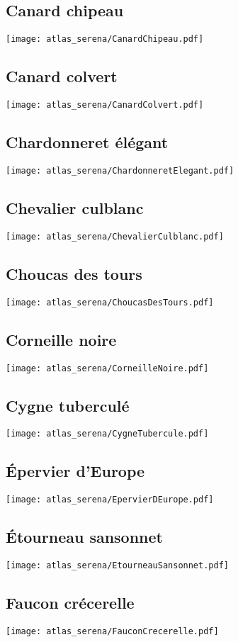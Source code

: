 \subsection{Canard chipeau}
\texttt{[image: atlas\_serena/CanardChipeau.pdf]}
\subsection{Canard colvert}
\texttt{[image: atlas\_serena/CanardColvert.pdf]}
\subsection{Chardonneret élégant}
\texttt{[image: atlas\_serena/ChardonneretElegant.pdf]}
\subsection{Chevalier culblanc}
\texttt{[image: atlas\_serena/ChevalierCulblanc.pdf]}
\subsection{Choucas des tours}
\texttt{[image: atlas\_serena/ChoucasDesTours.pdf]}
\subsection{Corneille noire}
\texttt{[image: atlas\_serena/CorneilleNoire.pdf]}
\subsection{Cygne tuberculé}
\texttt{[image: atlas\_serena/CygneTubercule.pdf]}
\subsection{Épervier d'Europe}
\texttt{[image: atlas\_serena/EpervierDEurope.pdf]}
\subsection{Étourneau sansonnet}
\texttt{[image: atlas\_serena/EtourneauSansonnet.pdf]}
\subsection{Faucon crécerelle}
\texttt{[image: atlas\_serena/FauconCrecerelle.pdf]}
